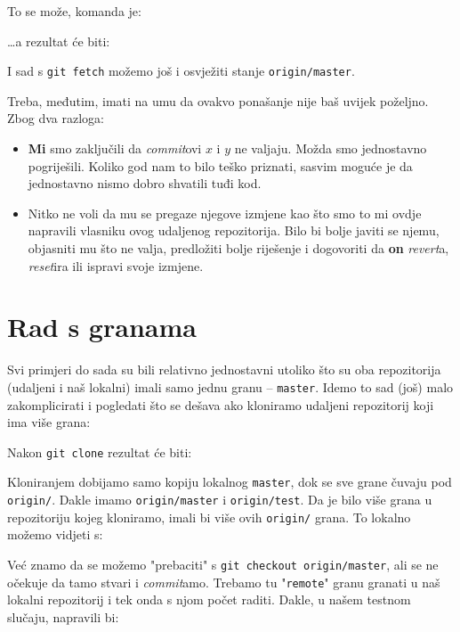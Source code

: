 To se može, komanda je:


\dots{}a rezultat će biti:



I sad s \verb+git fetch+ možemo još i osvježiti stanje \verb+origin/master+.

Treba, međutim, imati na umu da ovakvo ponašanje nije baš uvijek poželjno. 
Zbog dva razloga:

\begin{itemize}
	\item \textbf{Mi} smo zaključili da \emph{commit}ovi $x$ i $y$ ne valjaju. Možda smo jednostavno pogriješili. Koliko god nam to bilo teško priznati, sasvim moguće je da jednostavno nismo dobro shvatili tuđi kod.
	\item Nitko ne voli da mu se pregaze njegove izmjene kao što smo to mi ovdje napravili vlasniku ovog udaljenog repozitorija. Bilo bi bolje javiti se njemu, objasniti mu što ne valja, predložiti bolje riješenje i dogovoriti da \textbf{on} \emph{revert}a, \emph{reset}ira ili ispravi svoje izmjene.
\end{itemize}

\section*{Rad s granama}

Svi primjeri do sada su bili relativno jednostavni utoliko što su oba repozitorija (udaljeni i naš lokalni) imali samo jednu granu -- \verb+master+.
Idemo to sad (još) malo zakomplicirati i pogledati što se dešava ako kloniramo udaljeni repozitorij koji ima više grana:

Nakon \verb+git clone+ rezultat će biti:



Kloniranjem dobijamo samo kopiju lokalnog \verb+master+, dok se sve grane čuvaju pod \verb+origin/+. Dakle imamo \verb+origin/master+ i \verb+origin/test+.
Da je bilo više grana u repozitoriju kojeg kloniramo, imali bi više ovih \verb+origin/+ grana.
To lokalno možemo vidjeti s:



Već znamo da se možemo "prebaciti" s \verb+git checkout origin/master+, ali se ne očekuje da tamo stvari i \emph{commit}amo.
Trebamo tu "\verb+remote+" granu granati u naš lokalni repozitorij i tek onda s njom počet raditi.
Dakle, u našem testnom slučaju, napravili bi:

